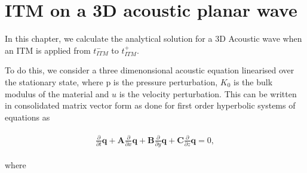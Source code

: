 
\section{\ac{ITM} on a 3D acoustic planar wave}\label{section:3DITMAcoustic}
In this chapter, we calculate the analytical solution for a 3D Acoustic wave when an \ac{ITM} is applied from $t_{ITM}^-$ to $t_{ITM}^+$.

To do this, we consider a three dimenonsional acoustic equation linearised over the stationary state, where p is the pressure perturbation, $K_0$ is the bulk
modulus of the material and $u$ is the velocity perturbation.
This can be written in consolidated matrix vector form as done for first order hyperbolic systems of equations as

\begin{align}
    \begin{split}
        \frac{\partial}{\partial t}\mathbf{q} + \mathbf{A}\frac{\partial}{\partial x}\mathbf{q} + \mathbf{B}\frac{\partial}{\partial y}\mathbf{q} + 
        \mathbf{C}\frac{\partial}{\partial z}\mathbf{q} = 0,
    \end{split}
    \label{eq:3Dacoustic}
\end{align}

where 

